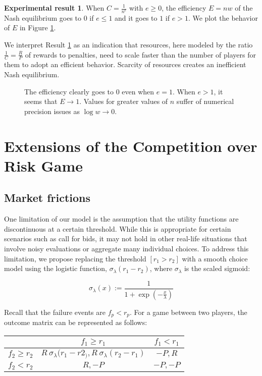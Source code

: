 \documentclass[preprint,12pt,authoryear,doubleblind]{elsarticle}
\theoremstyle{definition}
\newtheorem{result}[theorem]{Experimental result}
\begin{document}
\begin{result}
\label{res:scaling}
    When $C = \frac{1}{n^e}$ with $e \ge 0$, the efficiency $E = n w$ of the Nash equilibrium goes to $0$ if $e \le 1$ and it goes to $1$ if $e > 1$. We plot the behavior of $E$ in Figure \ref{fig:efficiency}.
\end{result}

We interpret Result \ref{res:scaling} as an indication that resources, here modeled by the ratio $\frac{1}{C} = \frac{R}{P}$ of rewards to penalties, need to scale faster than the number of players for them to adopt an efficient behavior. Scarcity of resources creates an inefficient Nash equilibrium.

\begin{figure}[htbp]
    \centering
    
    \caption{The efficiency clearly goes to $0$ even when $e = 1$. When $e>1$, it seems that $E \rightarrow 1$. Values for greater values of $n$ suffer of numerical precision issues as $\log w \rightarrow 0$.}
    \label{fig:efficiency}
\end{figure}

\section{Extensions of the Competition over Risk Game}


\subsection{Market frictions}

One limitation of our model is the assumption that the utility functions are discontinuous at a certain threshold. While this is appropriate for certain scenarios such as call for bids, it may not hold in other real-life situations that involve noisy evaluations or aggregate many individual choices. To address this limitation, we propose replacing the threshold $[r_1 > r_2]$ with a smooth choice model using the logistic function, $\sigma_\lambda(r_1 - r_2)$, where $\sigma_\lambda$ is the scaled sigmoid:

$$\sigma_\lambda(x) := \frac{1}{1+\exp\left(-\frac{x}{\lambda}\right)}$$


Recall that the failure events are $f_p < r_p$. For a game between two players, the outcome matrix can be represented as follows:
\begin{center}
\begin{tabular}{|c|c|c|}
\cline{2-3}
\multicolumn{1}{c|}{} & $f_1\ge r_1$ & $f_1<r_1$ \\
\hline
$f_2\ge r_2$ & $R~\sigma_\lambda(r_1 - r2_), R~\sigma_\lambda(r_2 - r_1) $ & $-P, R$ \\
\hline
$f_2<r_2$ & $R, -P$ &  $-P, -P$ \\
\hline
\end{tabular}
\end{center}
\end{document}
